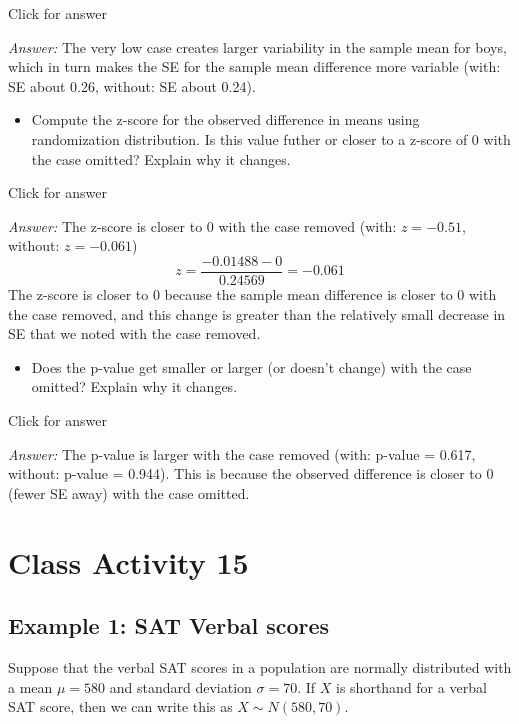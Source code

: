 \documentclass[
]{book}
\providecommand{\tightlist}{%
  \setlength{\itemsep}{0pt}\setlength{\parskip}{0pt}}
\begin{document}
Click for answer

\emph{Answer:} The very low case creates larger variability in the sample mean for boys, which in turn makes the SE for the sample mean difference more variable (with: SE about 0.26, without: SE about 0.24).

\begin{itemize}
\tightlist
\item
  Compute the z-score for the observed difference in means using randomization distribution. Is this value futher or closer to a z-score of 0 with the case omitted? Explain why it changes.
\end{itemize}

Click for answer

\emph{Answer:} The z-score is closer to 0 with the case removed (with: \(z = -0.51\), without: \(z = -0.061\))
\[
z = \dfrac{-0.01488  - 0}{0.24569} = -0.061
\]
The z-score is closer to 0 because the sample mean difference is closer to 0 with the case removed, and this change is greater than the relatively small decrease in SE that we noted with the case removed.

\vspace*{.5in}

\begin{itemize}
\tightlist
\item
  Does the p-value get smaller or larger (or doesn't change) with the case omitted? Explain why it changes.
\end{itemize}

Click for answer

\emph{Answer:} The p-value is larger with the case removed (with: p-value = 0.617, without: p-value = 0.944). This is because the observed difference is closer to 0 (fewer SE away) with the case omitted.

\hypertarget{class-activity-15}{%
\chapter{Class Activity 15}\label{class-activity-15}}

\hypertarget{example-1-sat-verbal-scores}{%
\section{Example 1: SAT Verbal scores}\label{example-1-sat-verbal-scores}}

Suppose that the verbal SAT scores in a population are normally distributed with a mean \(\mu=580\) and standard deviation \(\sigma = 70\). If \(X\) is shorthand for a verbal SAT score, then we can write this as \(X \sim N(580,70)\).
\end{document}
